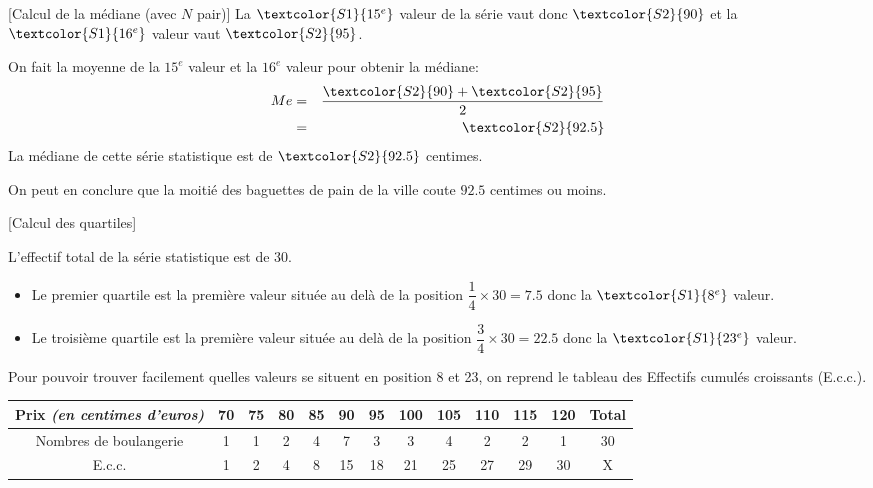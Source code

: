 \begin{ex}{}{}
\begin{methode}{}{}[Calcul de la médiane (avec $N$ pair)]
\noindent La $\textcolor{S1}{15^{e}}$ valeur de la série vaut donc $\textcolor{S2}{90}$ et la $\textcolor{S1}{16^{e}}$ valeur vaut $\textcolor{S2}{95}$.

\noindent On fait la moyenne de la $15^{e}$ valeur et la $16^{e}$ valeur pour obtenir la médiane:
\begin{eqnarray*}
Me &=& \frac{\textcolor{S2}{90}+\textcolor{S2}{95}}{2}\\ 
&=& \textcolor{S2}{92.5}
\end{eqnarray*}
\noindent La médiane de cette série statistique est de $\textcolor{S2}{92.5}$ centimes.

\noindent On peut en conclure que la moitié des baguettes de pain de la ville coute $92.5$ centimes ou moins.
\end{methode}

\begin{methode}{}{}[Calcul des quartiles]

L'effectif total de la série statistique est de $30$.
\begin{itemize}
\item[-]Le premier quartile est la première valeur située au delà de la position $ \dfrac{1}{4} \times 30 = 7.5 $ donc la $\textcolor{S1}{8^{e}}$ valeur.
\item[-]Le troisième quartile est la première valeur située au delà de la position $ \dfrac{3}{4} \times 30 = 22.5 $ donc la $\textcolor{S1}{23^{e}}$ valeur.
\end{itemize}
Pour pouvoir trouver facilement quelles valeurs se situent en position \textcolor{S1}{8} et \textcolor{S1}{23}, on reprend le tableau des Effectifs cumulés croissants (E.c.c.).
\end{methode}

\begin{center}
\renewcommand{\arraystretch}{1.8}
\begin{tabular}{|c|c|c|c|c|c|c|c|c|c|c|c|c|}
\hline 
Prix \textit{(en centimes d'euros)} & 70 & 75 & 80 & \textcolor{S2}{85} & 90 & 95 & 100 & \textcolor{S2}{105} & 110 & 115 & 120 & Total \\ 
\hline 
Nombres de boulangerie & 1 & 1 & 2 & 4 & 7 & 3 & 3 & 4 & 2 & 2 & 1 & 30 \\ 
\hline 
E.c.c. & 1 & 2 & 4 & \textcolor{S1}{8} & 15 & 18 & 21 & \textcolor{S1}{25} & 27 & 29 & 30 & X \\ 
\hline 
\end{tabular} 
\end{center}


\end{ex}
